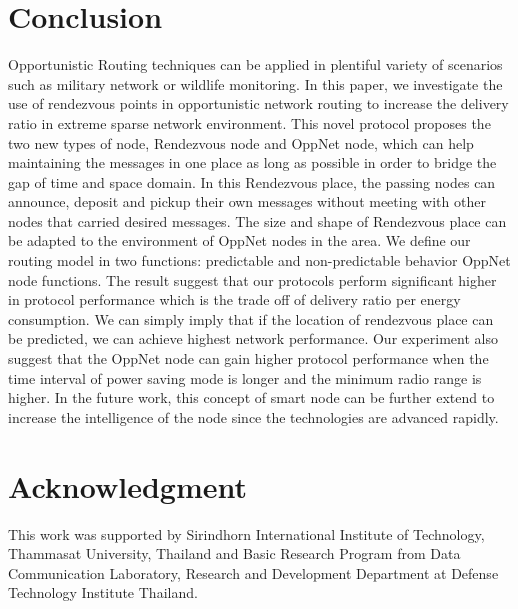\documentclass[conference]{IEEEtran}
\begin{document}
\section{Conclusion}
Opportunistic Routing techniques can be applied in  plentiful variety of scenarios such as military network or wildlife monitoring. 
In this paper, we investigate the use of rendezvous points in opportunistic network routing to increase the delivery ratio in extreme sparse network environment.
This novel protocol proposes the two new types of node, Rendezvous node and OppNet node, which can help maintaining the messages in one place as long as possible in order to bridge the gap of time and space domain.
In this Rendezvous place, the passing nodes can announce, deposit and pickup their own messages without meeting with other nodes that carried desired messages.
The size and shape of  Rendezvous place can be adapted to the environment of OppNet nodes in the area.
We define our routing model in two functions: predictable  and non-predictable behavior OppNet node functions.
The result suggest that our protocols perform significant higher in protocol performance which is the trade off of delivery ratio per energy consumption.
We can simply imply that if the location of rendezvous place can be predicted, we can achieve highest network performance.
Our experiment also suggest that the OppNet node can gain higher protocol performance when the time interval of power saving mode is longer and the minimum radio range is higher.
In the future work, this concept of smart node can be further extend to increase the intelligence of the node since the technologies are advanced rapidly.


\section*{Acknowledgment}
This work was supported by Sirindhorn International Institute of Technology, Thammasat University, Thailand and Basic Research Program from Data Communication Laboratory, Research and Development Department at Defense Technology Institute Thailand.



\end{document}

